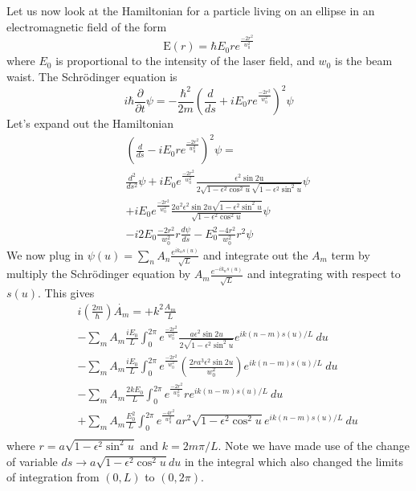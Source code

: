 \documentclass[aps,pra,showpacs,twocolumn]{revtex4}
\begin{document}
Let us now look at the Hamiltonian for a particle living on an ellipse in an electromagnetic field of the form
\begin{equation}
\mathrm{E}(r)= \hbar E_0 r e^{\frac{-2r^2}{w_0^2}} 
\end{equation}
where $E_0$ is proportional to the intensity of the laser field, and $w_0$ is the beam waist. The Schr\"{o}dinger equation is
\begin{equation}
i\hbar\frac{\partial}{\partial t}\psi=-\frac{\hbar^2}{2m} \left(\frac{d}{d s}+i E_0 r e^{\frac{-2r^2}{w_0^2}} \right)^2 \psi 
\end{equation}
Let's expand out the Hamiltonian 
\begin{eqnarray}
&&\left(\frac{d}{d s}-i E_0 r e^{\frac{-2r^2}{w_0^2}} \right)^2\psi=  \\ 
&&\frac{d^2}{d s^2}\psi +iE_0e^{\frac{-2r^2}{w_0^2}}\frac{\epsilon^2 \mathrm{\sin{2u}}}{2\sqrt{1-\epsilon^2 \cos^2 u}\sqrt{1-\epsilon^2 \sin^2 u}}\psi \nonumber \\
&&+iE_0e^{\frac{-2r^2}{w_0^2}}\frac{2a^2\epsilon^2 \sin{2u}\sqrt{1-\epsilon^2 \sin^2 u}}{\sqrt{1-\epsilon^2 \cos^2 u}}\psi \nonumber \\
&& -i2E_0\frac{-2r^2}{w_0^2}r\frac{d\psi}{ds}-E_0^2\frac{-4r^2}{w_0^2}r^2\psi 
\end{eqnarray}
We now plug in $\psi(u)=\sum_{n} A_{n} \frac{e^{i k_{n} s(u)}}{\sqrt{L}}$ and integrate out the $A_m$ term by multiply the Schr\"{o}dinger equation by $A_{m} \frac{e^{-i k_{n} s(u)}}{\sqrt{L}}$ and integrating with respect to $s(u)$.  This gives 
\begin{eqnarray}
&&i\left(\frac{2m}{\hbar}\right)\dot{A_m}=+k^2\frac{A_m}{L} \nonumber \\
&& -\sum_m A_m\frac{i E_0}{L} \int_0^{2\pi} e^{\frac{-2r^2}{w_0^2}}\frac{a\epsilon^2 \sin{2u}}{2\sqrt{1-\epsilon^2 \sin^2 u}}e^{ik(n-m)s(u)/L}\:du \nonumber \\
&&-\sum_m A_m \frac{i E_0}{L}\int_0^{2\pi} e^{\frac{-2r^2}{w_0^2}}\left(\frac{2ra^3\epsilon^2 \sin{2u}}{w_0^2}\right)e^{ik(n-m)s(u)/L}\:du \nonumber \\
&&-\sum_m A_m \frac{2kE_0}{L}\int_0^{2\pi} e^{\frac{-2r^2}{w_0^2}}re^{ik(n-m)s(u)/L}\:du \nonumber \\
&&+\sum_m A_m\frac{E_0^2}{L}\int_0^{2\pi}e^{\frac{-4r^2}{w_0^2}}ar^2\sqrt{1-\epsilon^2 \cos^2 u}e^{ik(n-m)s(u)/L}\:du \nonumber \\
\end{eqnarray}
where $r=a \sqrt{1-\epsilon^2 \mathrm{\sin^2} u} $ and $k=2m\pi/L$.  Note we have made use of the change of variable $ds \rightarrow  a\sqrt{1-\epsilon^2 \cos^2 u}du$ in the integral which also changed the limits of integration from  $(0,L)$ to $(0,2\pi)$.
\end{document}
